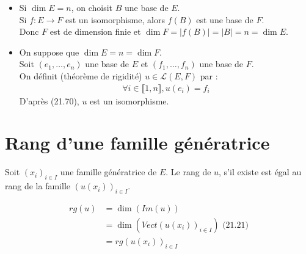\documentclass[../main.tex]{subfiles}
\begin{document}
\begin{itemize}
    \item Si $\dim E = n$, on choisit $B$ une base de $E$. \\
    Si $f:E\to F$ est un isomorphisme, alors $f(B)$ est une base de $F$. \\
    Donc $F$ est de dimension finie et $\dim F = |f(B)| = |B| = n = \dim E$. 

    \item On suppose que $\dim E = n = \dim F$. \\
    Soit $(e_1, \ldots, e_n)$ une base de $E$ et $(f_1, \ldots, f_n)$ une base de $F$. \\
    On définit (théorème de rigidité) $u \in \mathcal{L}(E, F)$ par : 
    \begin{align*}
        \forall i \in \llbracket 1, n \rrbracket, u(e_i) = f_i
    \end{align*}
    D'après (21.70), $u$ est un isomorphisme. 
\end{itemize}

\section{Rang d'une famille génératrice}
\begin{tcolorbox}[title=Propostion 22.35, title filled=false, colframe=lightblue, colback=lightblue!10!white]
    Soit $(x_i)_{i\in I}$ une famille génératrice de $E$. Le rang de $u$, s'il existe est égal au rang de la famille $(u(x_i))_{i\in I}$.
\end{tcolorbox}

\begin{align*}
    rg(u) &= \dim(Im(u)) \\
    &= \dim(Vect(u(x_i))_{i\in I}) \text{ (21.21)} \\
    &= rg(u(x_i))_{i\in I}
\end{align*}
\end{document}
